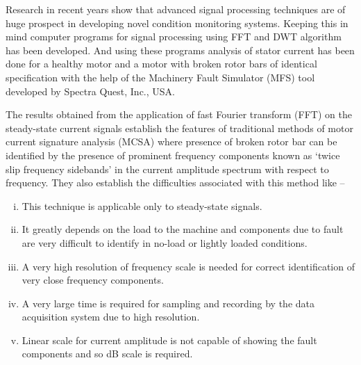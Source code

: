\documentclass[a4paper,11pt]{report}
\begin{document}
Research in recent years show that advanced signal processing techniques are of huge prospect in developing novel condition monitoring systems. Keeping this in mind computer programs for signal processing using FFT and DWT algorithm has been developed. And using these programs analysis of stator current has been done for a healthy motor and a motor with broken rotor bars of identical specification with the help of the Machinery Fault Simulator (MFS) tool developed by Spectra Quest, Inc., USA. 

The results obtained from the application of fast Fourier transform (FFT) on the steady-state current signals establish the features of traditional methods of motor current signature analysis (MCSA) where presence of broken rotor bar can be identified by the presence of prominent frequency components known as `twice slip frequency sidebands' in the current amplitude spectrum with respect to frequency. They also establish the difficulties associated with this method like --
\begin{enumerate}[(i)]
\item This technique is applicable only to steady-state signals.
\item It greatly depends on the load to the machine and components due to fault are very difficult to identify in no-load or lightly loaded conditions. 
\item A very high resolution of frequency scale is needed for correct identification of very close frequency components.
\item A very large time is required for sampling and recording by the data acquisition system due to high resolution.
\item Linear scale for current amplitude is not capable of showing the fault components and so dB scale is required.
\end{enumerate} 
\end{document}
